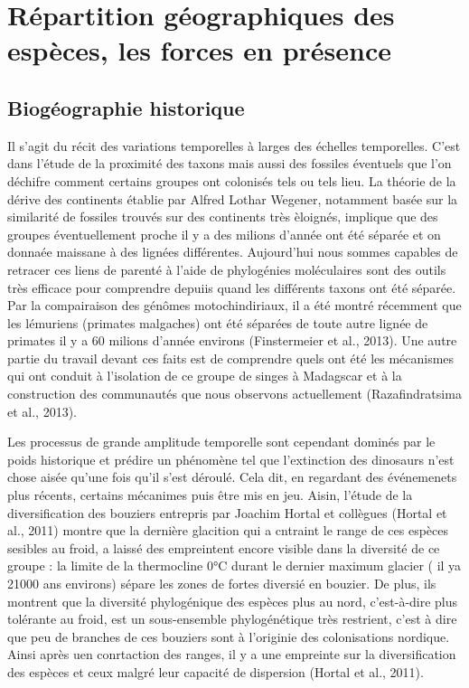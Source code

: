 \section*{Répartition géographiques des espèces, les forces en
présence}\label{ruxe9partition-guxe9ographiques-des-espuxe8ces-les-forces-en-pruxe9sence}

\subsection*{Biogéographie
historique}\label{bioguxe9ographie-historique}

Il s'agit du récit des variations temporelles à larges des échelles
temporelles. C'est dans l'étude de la proximité des taxons mais aussi
des fossiles éventuels que l'on déchifre comment certains groupes ont
colonisés tels ou tels lieu. La théorie de la dérive des continents
établie par Alfred Lothar Wegener, notamment basée sur la similarité de
fossiles trouvés sur des continents très èloignés, implique que des
groupes éventuellement proche il y a des milions d'année ont été séparée
et on donnaée maissane à des lignées différentes. Aujourd'hui nous
sommes capables de retracer ces liens de parenté à l'aide de phylogénies
moléculaires sont des outils très efficace pour comprendre depuiis quand
les différents taxons ont été séparée. Par la compairaison des génômes
motochindiriaux, il a été montré récemment que les lémuriens (primates
malgaches) ont été séparées de toute autre lignée de primates il y a 60
milions d'année environs (Finstermeier et al., 2013). Une autre partie
du travail devant ces faits est de comprendre quels ont été les
mécanismes qui ont conduit à l'isolation de ce groupe de singes à
Madagscar et à la construction des communautés que nous observons
actuellement (Razafindratsima et al., 2013).

Les processus de grande amplitude temporelle sont cependant dominés par
le poids historique et prédire un phénomène tel que l'extinction des
dinosaurs n'est chose aisée qu'une fois qu'il s'est déroulé. Cela dit,
en regardant des événemenets plus récents, certains mécanimes puis être
mis en jeu. Aisin, l'étude de la diversification des bouziers entrepris
par Joachim Hortal et collègues (Hortal et al., 2011) montre que la
dernière glacition qui a cntraint le range de ces espèces sesibles au
froid, a laissé des empreintent encore visible dans la diversité de ce
groupe : la limite de la thermocline 0°C durant le dernier maximum
glacier ( il ya 21000 ans environs) sépare les zones de fortes diversié
en bouzier. De plus, ils montrent que la diversité phylogénique des
espèces plus au nord, c'est-à-dire plus tolérante au froid, est un
sous-ensemble phylogénétique très restrient, c'est à dire que peu de
branches de ces bouziers sont à l'originie des colonisations nordique.
Ainsi après uen conrtaction des ranges, il y a une empreinte sur la
diversification des espèces et ceux malgré leur capacité de dispersion
(Hortal et al., 2011).

